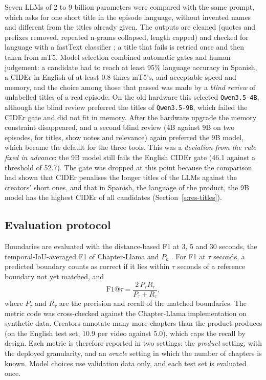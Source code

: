 Seven LLMs of 2 to 9 billion parameters were compared with the same prompt, which asks for one short title in the episode language, without invented names and different from the titles already given. The outputs are cleaned (quotes and prefixes removed, repeated n-grams collapsed, length capped) and checked for language with a fastText classifier \cite{joulin2017fasttext}; a title that fails is retried once and then taken from mT5. Model selection combined automatic gates and human judgement: a candidate had to reach at least 95\% language accuracy in Spanish, a CIDEr in English of at least 0.8 times mT5's, and acceptable speed and memory, and the choice among those that passed was made by a \textit{blind review} of unlabelled titles of a real episode. On the old hardware this selected \texttt{Qwen3.5-4B}, although the blind review preferred the titles of \texttt{Qwen3.5-9B}, which failed the CIDEr gate and did not fit in memory. After the hardware upgrade the memory constraint disappeared, and a second blind review (4B against 9B on two episodes, for titles, show notes and relevance) again preferred the 9B model, which became the default for the three tools. This was a \textit{deviation from the rule fixed in advance}: the 9B model still fails the English CIDEr gate (46.1 against a threshold of 52.7). The gate was dropped at this point because the comparison had shown that CIDEr penalises the longer titles of the LLMs against the creators' short ones, and that in Spanish, the language of the product, the 9B model has the highest CIDEr of all candidates (Section~\ref{s:res-titles}).

\subsection*{Evaluation protocol}

Boundaries are evaluated with the distance-based F1 at 3, 5 and 30 seconds, the temporal-IoU-averaged F1 of Chapter-Llama \cite{ventura2025chapterllama} and $P_k$ \cite{beeferman1999pk}. For F1 at $\tau$ seconds, a predicted boundary counts as correct if it lies within $\tau$ seconds of a reference boundary not yet matched, and
\begin{equation}
\mathrm{F1}@\tau = \frac{2\,P_\tau R_\tau}{P_\tau + R_\tau},
\label{eq:f1}
\end{equation}
where $P_\tau$ and $R_\tau$ are the precision and recall of the matched boundaries. The metric code was cross-checked against the Chapter-Llama implementation on synthetic data. Creators annotate many more chapters than the product produces (on the English test set, 10.9 per video against 5.0), which caps the recall by design. Each metric is therefore reported in two settings: the \textit{product} setting, with the deployed granularity, and an \textit{oracle} setting in which the number of chapters is known. Model choices use validation data only, and each test set is evaluated once.

